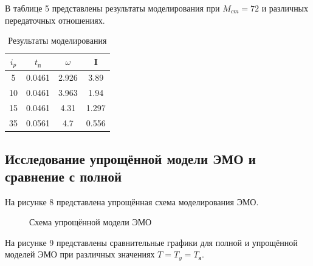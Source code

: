 \documentclass[a4paper, 11pt]{article}
\begin{document}
\par
В таблице 5 представлены результаты моделирования при $M_{cm}=72$ и различных передаточных отношениях.
\begin{table}[h!]
\centering
	\begin{threeparttable}
	\caption{Результаты моделирования}\label{tab:perflogcross}
		\begin{tabular}{|c|c|c|c|}
			\hline
			$i_p$ & $t_\text{п}$ & $\omega$ & I\\
			\hline
			5 & 0.0461 & 2.926 & 3.89\\
			\hline
			10 & 0.0461 & 3.963 & 1.94\\
			\hline
			15 & 0.0461 & 4.31 & 1.297\\
			\hline
			35 & 0.0561 & 4.7 & 0.556\\
			\hline
		\end{tabular}
	\end{threeparttable}
\end{table}

\newpage
\begin{center}
	\section{Исследование упрощённой модели ЭМО и сравнение с полной}
\end{center}
\par 
На рисунке 8 представлена упрощённая схема моделирования ЭМО.

\begin{figure}[h]
	\caption{Схема упрощённой модели ЭМО}
	\label{ris:image}
\end{figure}

\par 
На рисунке 9 представлены сравнительные графики для полной и упрощённой моделей ЭМО при различных значениях $T=T_y=T_\text{я}$.
\end{document}
